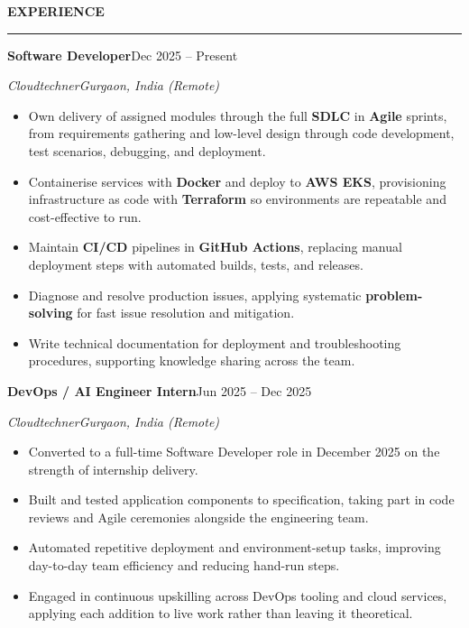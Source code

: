 \documentclass[11pt,a4paper]{article}
\newcommand{\resumeSection}[1]{%
  \vspace{7pt}%
  {\large\bfseries\color{primary}\MakeUppercase{#1}}\par
  \vspace{1pt}%
  \textcolor{secondary}{\rule{\textwidth}{0.6pt}}\par
  \vspace{3pt}%
}
\newcommand{\entryLine}[4]{%
  \par\vspace{3pt}%
  \begingroup\parfillskip=0pt\relax
    \noindent\textbf{#1}\hfill\textcolor{secondary}{#2}\par
    \noindent\textit{\textcolor{accent}{#3}}\hfill\textit{\textcolor{secondary}{#4}}\par
  \endgroup
  \vspace{1pt}%
}
\newenvironment{bullets}{%
  \begin{itemize}[leftmargin=1.4em, label=\textbullet, itemsep=1.5pt,
                  parsep=0pt, topsep=3pt, partopsep=0pt]
}{%
  \end{itemize}%
  \vspace{2pt}%
}
\begin{document}
\resumeSection{Experience}

\entryLine{Software Developer}{Dec 2025 -- Present}{Cloudtechner}{Gurgaon, India (Remote)}
\begin{bullets}
  \item Own delivery of assigned modules through the full \textbf{SDLC} in \textbf{Agile}
        sprints, from requirements gathering and low-level design through code
        development, test scenarios, debugging, and deployment.
  \item Containerise services with \textbf{Docker} and deploy to \textbf{AWS EKS},
        provisioning infrastructure as code with \textbf{Terraform} so environments are
        repeatable and cost-effective to run.
  \item Maintain \textbf{CI/CD} pipelines in \textbf{GitHub Actions}, replacing manual
        deployment steps with automated builds, tests, and releases.
  \item Diagnose and resolve production issues, applying systematic
        \textbf{problem-solving} for fast issue resolution and mitigation.
  \item Write technical documentation for deployment and troubleshooting procedures,
        supporting knowledge sharing across the team.
\end{bullets}

\entryLine{DevOps / AI Engineer Intern}{Jun 2025 -- Dec 2025}{Cloudtechner}{Gurgaon, India (Remote)}
\begin{bullets}
  \item Converted to a full-time Software Developer role in December 2025 on the strength
        of internship delivery.
  \item Built and tested application components to specification, taking part in code
        reviews and Agile ceremonies alongside the engineering team.
  \item Automated repetitive deployment and environment-setup tasks, improving day-to-day
        team efficiency and reducing hand-run steps.
  \item Engaged in continuous upskilling across DevOps tooling and cloud services,
        applying each addition to live work rather than leaving it theoretical.
\end{bullets}
\end{document}
